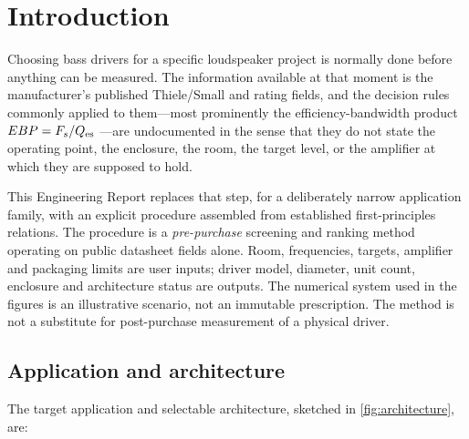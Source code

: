 \section{Introduction}
\label{sec:intro}

Choosing bass drivers for a specific loudspeaker project is normally done
before anything can be measured. The information available at that moment
is the manufacturer's published Thiele/Small and rating fields, and the
decision rules commonly applied to them---most prominently the
efficiency-bandwidth product $EBP=F_s/Q_{\mathrm{es}}$ \cite{dickason2006}---are
undocumented in the sense that they do not state the operating point, the
enclosure, the room, the target level, or the amplifier at which they are
supposed to hold.

This Engineering Report replaces that step, for a deliberately narrow
application family, with an explicit procedure assembled from established
first-principles relations. The procedure is a \emph{pre-purchase}
screening and ranking method operating on public datasheet fields alone.
Room, frequencies, targets, amplifier and packaging limits are user inputs;
driver model, diameter, unit count, enclosure and architecture status are
outputs. The numerical system used in the figures is an illustrative
scenario, not an immutable prescription. The method is not a substitute for
post-purchase measurement of a physical driver.

\subsection{Application and architecture}
\label{sec:intro-arch}

The target application and selectable architecture, sketched in
\cref{fig:architecture}, are:

